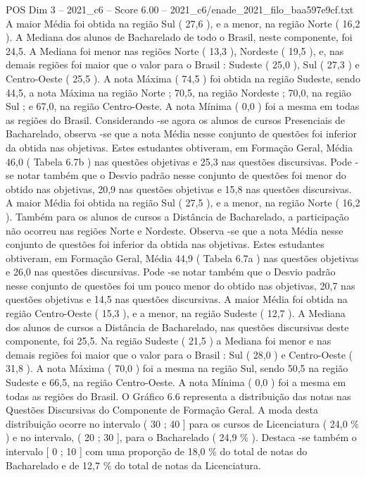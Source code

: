 \begin{textsample}{POS Dim 3 – 2021\_c6 – Score 6.00 – 2021\_c6/enade\_2021\_filo\_baa597e9cf.txt}
A maior Média foi obtida na região Sul ( 27,6 ), e a menor, na região Norte ( 16,2 ).
A Mediana dos alunos de Bacharelado de todo o Brasil, neste componente, foi 24,5.
A Mediana foi menor nas regiões Norte ( 13,3 ), Nordeste ( 19,5 ), e, nas demais regiões foi maior que o valor para o Brasil : Sudeste ( 25,0 ), Sul ( 27,3 ) e Centro-Oeste ( 25,5 ).
A nota Máxima ( 74,5 ) foi obtida na região Sudeste, sendo 44,5, a nota Máxima na região Norte ; 70,5, na região Nordeste ; 70,0, na região Sul ; e 67,0, na região Centro-Oeste.
A nota Mínima ( 0,0 ) foi a mesma em todas as regiões do Brasil.
Considerando -se agora os alunos de cursos Presenciais de Bacharelado, observa -se que a nota Média nesse conjunto de questões foi inferior da obtida nas objetivas.
Estes estudantes obtiveram, em Formação Geral, Média 46,0 ( Tabela 6.7b ) nas questões objetivas e 25,3 nas questões discursivas.
Pode -se notar também que o Desvio padrão nesse conjunto de questões foi menor do obtido nas objetivas, 20,9 nas questões objetivas e 15,8 nas questões discursivas.
A maior Média foi obtida na região Sul ( 27,5 ), e a menor, na região Norte ( 16,2 ).
Também para os alunos de cursos a Distância de Bacharelado, a participação não ocorreu nas regiões Norte e Nordeste.
Observa -se que a nota Média nesse conjunto de questões foi inferior da obtida nas objetivas.
Estes estudantes obtiveram, em Formação Geral, Média 44,9 ( Tabela 6.7a ) nas questões objetivas e 26,0 nas questões discursivas.
Pode -se notar também que o Desvio padrão nesse conjunto de questões foi um pouco menor do obtido nas objetivas, 20,7 nas questões objetivas e 14,5 nas questões discursivas.
A maior Média foi obtida na região Centro-Oeste ( 15,3 ), e a menor, na região Sudeste ( 12,7 ).
A Mediana dos alunos de cursos a Distância de Bacharelado, nas questões discursivas deste componente, foi 25,5.
Na região Sudeste ( 21,5 ) a Mediana foi menor e nas demais regiões foi maior que o valor para o Brasil : Sul ( 28,0 ) e Centro-Oeste ( 31,8 ).
A nota Máxima ( 70,0 ) foi a mesma na região Sul, sendo 50,5 na região Sudeste e 66,5, na região Centro-Oeste.
A nota Mínima ( 0,0 ) foi a mesma em todas as regiões do Brasil.
O Gráfico 6.6 representa a distribuição das notas nas Questões Discursivas do Componente de Formação Geral.
A moda desta distribuição ocorre no intervalo ( 30 ; 40 ] para os cursos de Licenciatura ( 24,0 \% ) e no intervalo, ( 20 ; 30 ], para o Bacharelado ( 24,9 \% ).
Destaca -se também o intervalo [ 0 ; 10 ] com uma proporção de 18,0 \% do total de notas do Bacharelado e de 12,7 \% do total de notas da Licenciatura.

\end{textsample}
